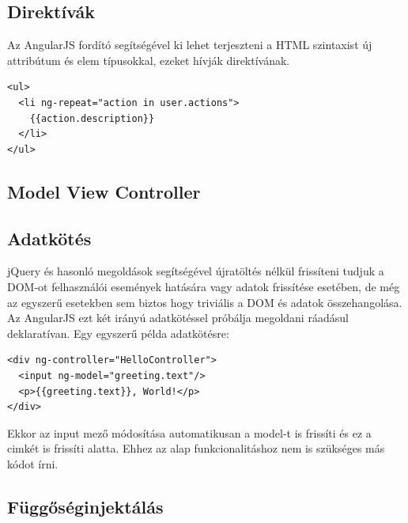 \subsection{Direktívák}

Az AngularJS fordító segítségével ki lehet terjeszteni a HTML szintaxist új attribútum és elem típusokkal, ezeket hívják direktívának. 

\lstset{language=HTML}
\begin{lstlisting}[frame=single]  
<ul>
  <li ng-repeat="action in user.actions">
    {{action.description}}
  </li>
</ul>
\end{lstlisting}

\subsection{Model View Controller}

\subsection{Adatkötés}

jQuery és hasonló megoldások segítségével újratöltés nélkül frissíteni tudjuk a DOM-ot felhasználói események hatására vagy adatok frissítése esetében, de még az egyszerű esetekben sem biztos hogy triviális a DOM és adatok összehangolása. Az AngularJS ezt két irányú adatkötéssel próbálja megoldani ráadásul deklaratívan. Egy egyszerű példa adatkötésre:

\lstset{language=HTML}
\begin{lstlisting}[frame=single]  
<div ng-controller="HelloController">
  <input ng-model="greeting.text"/>
  <p>{{greeting.text}}, World!</p>
</div>
\end{lstlisting}
Ekkor az input mező módosítása automatikusan a model-t is frissíti és ez a cimkét is frissíti alatta. Ehhez az alap funkcionalitáshoz nem is szükséges más kódot írni.


\subsection{Függőséginjektálás}


